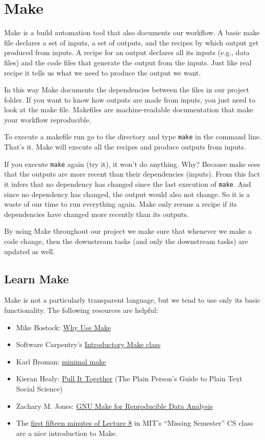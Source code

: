 \section{Make}

Make is a build automation tool that also documents our workflow. A basic make file declares a set of inputs, a set of outputs, and the recipes by which output get produced from inputs. A recipe for an output declares all its inputs (e.g., data files) and the code files that generate the output from the inputs. Just like real recipe it tells us what we need to produce the output we want.

In this way Make documents the dependencies between the files in our project folder. If you want to know how outputs are made from inputs, you just need to look at the make file. Makefiles are machine-readable documentation that make your workflow reproducible.

To execute a makefile run go to the directory and type \texttt{make} in the command line. That's it. Make will execute all the recipes and produce outputs from inputs.

If you execute \texttt{make} again (try it), it won't do anything. Why? Because make sees that the outputs are more recent than their dependencies (inputs). From this fact it infers that no dependency has changed since the last execution of \texttt{make}. And since no dependency has changed, the output would also not change. So it is a waste of our time to run everything again. Make only reruns a recipe if its dependencies have changed more recently than its outputs.

By using Make throughout our project we make sure that whenever we make a code change, then the downstream tasks (and only the downstream tasks) are updated as well.

\subsection{Learn Make}

Make is not a particularly transparent language, but we tend to use only its basic functionality. The following resources are helpful:

\begin{itemize}
\item Mike Bostock: \href{https://bost.ocks.org/mike/make/}{Why Use Make}
\item Software Carpentry's \href{http://swcarpentry.github.io/make-novice/}{Introductory Make class}
\item Karl Broman: \href{http://kbroman.org/minimal_make/}{minimal make}
\item Kieran Healy: \href{http://plain-text.co/pull-it-together.html}{Pull It Together} (The Plain Person's Guide to Plain Text Social Science)
\item Zachary M. Jones: \href{http://zmjones.com/make/}{GNU Make for Reproducible Data Analysis}
\item The \href{https://www.youtube.com/watch?v=_Ms1Z4xfqv4}{first fifteen minutes of Lecture 8} in MIT's ``Missing Semester'' CS class are a nice introduction to Make.
\end{itemize}


